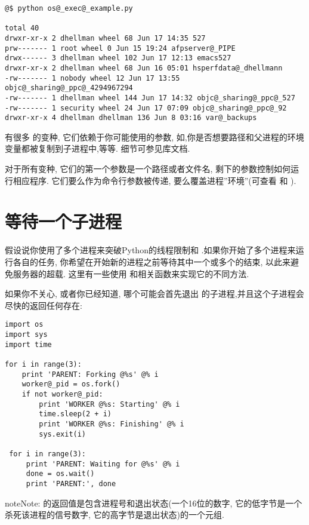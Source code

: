 \documentclass[a4paper,10pt,english]{manual}
\begin{document}
\begin{Verbatim}[commandchars=@\[\]]
@$ python os@_exec@_example.py

total 40
drwxr-xr-x 2 dhellman wheel 68 Jun 17 14:35 527
prw------- 1 root wheel 0 Jun 15 19:24 afpserver@_PIPE
drwx------ 3 dhellman wheel 102 Jun 17 12:13 emacs527
drwxr-xr-x 2 dhellman wheel 68 Jun 16 05:01 hsperfdata@_dhellmann
-rw------- 1 nobody wheel 12 Jun 17 13:55 objc@_sharing@_ppc@_4294967294
-rw------- 1 dhellman wheel 144 Jun 17 14:32 objc@_sharing@_ppc@_527
-rw------- 1 security wheel 24 Jun 17 07:09 objc@_sharing@_ppc@_92
drwxr-xr-x 4 dhellman dhellman 136 Jun 8 03:16 var@_backups
\end{Verbatim}

有很多  的变种, 它们依赖于你可能使用的参数, 如,你是否想要路径和父进程的环境变量都被复制到子进程中,等等. 细节可参见库文档.

对于所有变种, 它们的第一个参数是一个路径或者文件名, 剩下的参数控制如何运行相应程序. 它们要么作为命令行参数被传递, 要么覆盖进程''环境''(可查看  和  ).


\section{等待一个子进程}

假设说你使用了多个进程来突破Python的线程限制和 .如果你开始了多个进程来运行各自的任务, 你希望在开始新的进程之前等待其中一个或多个的结束, 以此来避免服务器的超载. 这里有一些使用  和相关函数来实现它的不同方法.

如果你不关心, 或者你已经知道, 哪个可能会首先退出  的子进程,并且这个子进程会尽快的返回任何存在:

\begin{Verbatim}[commandchars=@\[\]]
import os
import sys
import time

for i in range(3):
    print 'PARENT: Forking @%s' @% i
    worker@_pid = os.fork()
    if not worker@_pid:
        print 'WORKER @%s: Starting' @% i
        time.sleep(2 + i)
        print 'WORKER @%s: Finishing' @% i
        sys.exit(i)

 for i in range(3):
     print 'PARENT: Waiting for @%s' @% i
     done = os.wait()
     print 'PARENT:', done
\end{Verbatim}

\begin{notice}{note}{Note:}
 的返回值是包含进程号和退出状态(一个16位的数字, 它的低字节是一个杀死该进程的信号数字, 它的高字节是退出状态)的一个元组.
\end{notice}
\end{document}
